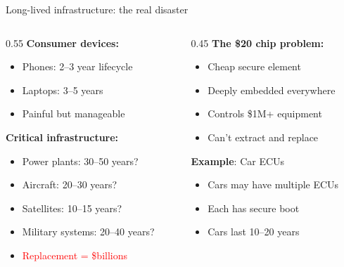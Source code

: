 \ifdefined\PRESENTATION\else\PassOptionsToClass{handout}{beamer}\fi\documentclass[aspectratio=169, lualatex]{beamer}
\begin{document}
\begin{frame}{Long-lived infrastructure: the real disaster}
	\begin{columns}[c]
		\begin{column}{0.55\textwidth}
			\textbf{Consumer devices:}
			\begin{itemize}
				\item Phones: 2--3 year lifecycle
				\item Laptops: 3--5 years
				\item \textcolor{green!70!black}{Painful but manageable}
			\end{itemize}
			\textbf{Critical infrastructure:}
			\begin{itemize}
				\item Power plants: 30--50 years?
				\item Aircraft: 20--30 years?
				\item Satellites: 10--15 years?
				\item Military systems: 20--40 years?
				\item \textcolor{red}{Replacement = \$billions}
			\end{itemize}
		\end{column}
		\begin{column}{0.45\textwidth}
			\textbf{The \$20 chip problem:}
			\begin{itemize}
				\item Cheap secure element
				\item Deeply embedded everywhere
				\item Controls \$1M+ equipment
				\item Can't extract and replace
			\end{itemize}
			\textbf{Example}: Car ECUs
			\begin{itemize}
				\item Cars may have multiple ECUs
				\item Each has secure boot
				\item Cars last 10--20 years
			\end{itemize}
		\end{column}
	\end{columns}
\end{frame}
\end{document}
